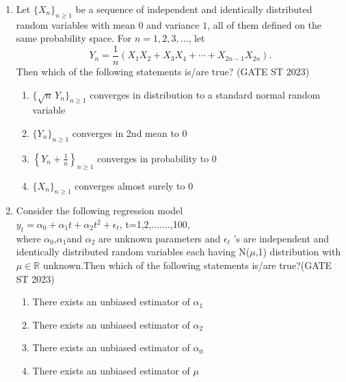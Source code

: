 \documentclass[journal]{IEEEtran}
\begin{document}
\begin{enumerate}[label=\textbf{Q.\arabic*.}, start=1, align=left, itemsep=2em]
\begin{enumerate}[label=\textbf{Q.\arabic*.}, start=11, align=left, itemsep=2em]
\item Let $\{X_n\}_{n \ge 1}$ be a sequence of independent and identically distributed random 
variables with mean $0$ and variance $1$, all of them defined on the same 
probability space. For $n = 1, 2, 3, \dots$, let  
\[
Y_n = \frac{1}{n} \left( X_1 X_2 + X_3 X_4 + \cdots + X_{2n-1} X_{2n} \right).
\]
Then which of the following statements is/are true? \hfill(GATE ST 2023) 

\begin{enumerate}[label=(\Alph*)]
    \item $\{\sqrt{n} \, Y_n\}_{n \ge 1}$ converges in distribution to a standard normal random variable
    \item $\{Y_n\}_{n \ge 1}$ converges in 2nd mean to $0$
    \item $\left\{ Y_n + \frac{1}{n} \right\}_{n \ge 1}$ converges in probability to $0$
    \item $\{X_n\}_{n \ge 1}$ converges almost surely to $0$
\end{enumerate}


\item Consider the following regression model \\

$y_t = \alpha_0 + \alpha_1 t + \alpha_2 t^2 + \epsilon_t$,      t=1,2,.......,100, \\

where $\alpha_0$,$\alpha_1$and $\alpha_2$ are unknown parameters and $\epsilon_t$ 's are independent and identically distributed random variables each having N($\mu$,1) distribution with $\mu \in \mathbb{R}$ unknown.Then which of the following statements is/are true?\hfill(GATE ST 2023)
\begin{enumerate}[label=(\Alph*)]
\item There exists an unbiased estimator of $\alpha_1$
\item There exists an unbiased estimator of $\alpha_2$
\item There exists an unbiased estimator of $\alpha_0$
\item There exists an unbiased estimator of $\mu$
\end{enumerate}


\end{enumerate}
\end{enumerate}
\end{document}
